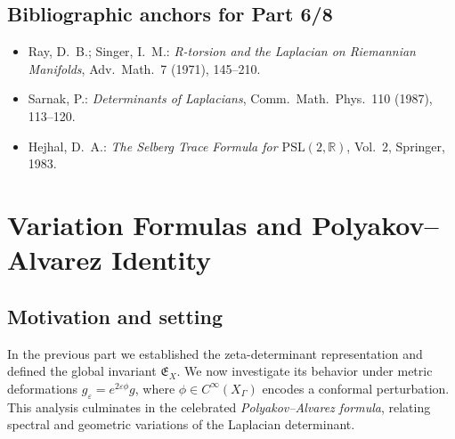 \subsection{Bibliographic anchors for Part 6/8}
\label{subsec:ch4-part6-bib-anchors} \relax

\begin{itemize}
  \item Ray, D.~B.; Singer, I.~M.: \emph{R-torsion and the Laplacian on Riemannian Manifolds}, Adv.\ Math.\ 7 (1971), 145–210. %
  \item Sarnak, P.: \emph{Determinants of Laplacians}, Comm.\ Math.\ Phys.\ 110 (1987), 113–120. %
  \item Hejhal, D.~A.: \emph{The Selberg Trace Formula for $\mathrm{PSL}(2,\mathbb{R})$}, Vol.~2, Springer, 1983. %
\end{itemize}


\section{Variation Formulas and Polyakov–Alvarez Identity}
\label{sec:ch4-part7-variation} \relax \hspace{0pt}

\subsection{Motivation and setting}
\label{subsec:ch4-part7-setting} \relax

In the previous part we established the zeta-determinant representation and defined the global invariant $\mathfrak{E}_X$.  
We now investigate its behavior under metric deformations $g_\varepsilon = e^{2\varepsilon\phi}g$, where $\phi\in C^\infty(X_\Gamma)$ encodes a conformal perturbation.  
This analysis culminates in the celebrated \emph{Polyakov–Alvarez formula}, relating spectral and geometric variations of the Laplacian determinant.

